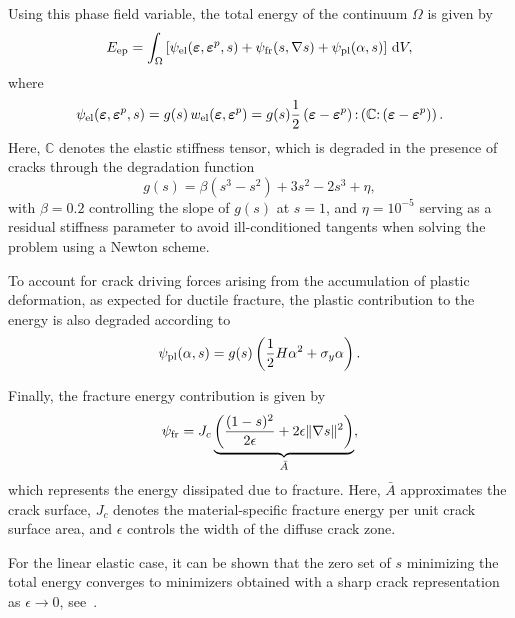 \documentclass[pdflatex,sn-mathphys-num]{sn-jnl}%
\theoremstyle{thmstyleone}%
\theoremstyle{thmstyletwo}%
\theoremstyle{thmstylethree}%
\begin{document}
Using this phase field variable, the total energy of the continuum $\Omega$ is given by
\begin{equation}
    E_{\rm{ep}} = \int_{\Omega} \left[ 
    \psi_{\rm{el}}(\boldsymbol{\varepsilon},\boldsymbol{\varepsilon}^p,s) 
    + \psi_{\rm{fr}}(s,\nabla{s}) 
    + \psi_{\rm{pl}}(\alpha,s)
    \right] \, \mathrm{d}V,
\end{equation}
where
\begin{equation}
    \psi_{\rm{el}}(\boldsymbol{\varepsilon},\boldsymbol{\varepsilon}^p,s)
    = g(s)\,w_{\rm{el}}(\boldsymbol{\varepsilon},\boldsymbol{\varepsilon}^p)
    = g(s)\dfrac{1}{2}
    \left(\boldsymbol{\varepsilon}-\boldsymbol{\varepsilon}^p\right)
    {:}
    \left(\boldsymbol{\mathbb{C}}{:}
    \left(\boldsymbol{\varepsilon}-\boldsymbol{\varepsilon}^p\right)\right).
\end{equation}
Here, $\boldsymbol{\mathbb{C}}$ denotes the elastic stiffness tensor, which is degraded in the presence of cracks through the degradation function
\begin{equation}
    g(s) = \beta\left(s^3 - s^2\right) + 3s^2 - 2s^3 + \eta,
    \label{eq:deg_grad}
\end{equation}
with $\beta = 0.2$ controlling the slope of $g(s)$ at $s=1$, and $\eta = 10^{-5}$ serving as a residual stiffness parameter to avoid ill-conditioned tangents when solving the problem using a Newton scheme.

To account for crack driving forces arising from the accumulation of plastic deformation, as expected for ductile fracture, the plastic contribution to the energy is also degraded according to
\begin{equation}
    \psi_{\rm{pl}}(\alpha,s) = g(s)\left(\dfrac{1}{2}H\alpha^2 + \sigma_y\alpha\right).
\end{equation}

Finally, the fracture energy contribution is given by
\begin{equation}
    \psi_{\rm{fr}} = J_c
    \underbrace{\left(
    \dfrac{(1-s)^2}{2\epsilon} + 2\epsilon\|\nabla{s}\|^2
    \right)}_{\bar{A}},
\end{equation}
which represents the energy dissipated due to fracture. 
Here, $\bar{A}$ approximates the crack surface, $J_c$ denotes the material-specific fracture energy per unit crack surface area, and $\epsilon$ controls the width of the diffuse crack zone.

For the linear elastic case, it can be shown that the zero set of $s$ minimizing the total energy converges to minimizers obtained with a sharp crack representation as $\epsilon \to 0$, see~\cite{chambolle_approximation_2004}.
\end{document}
